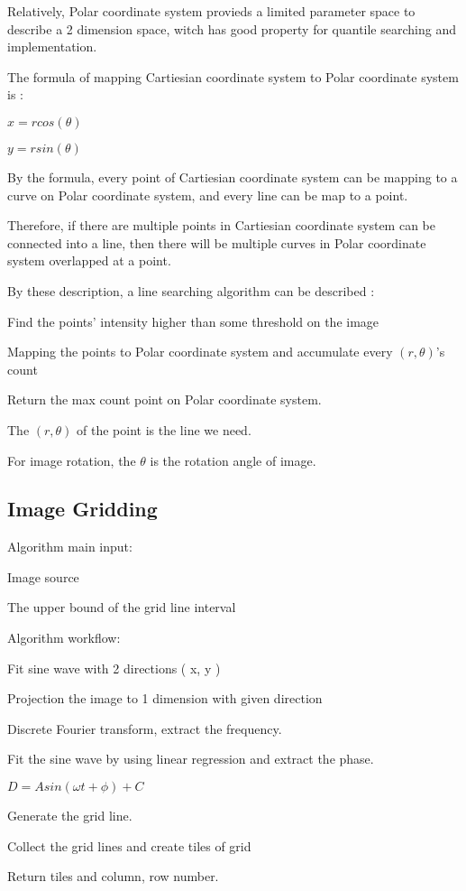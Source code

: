 Relatively, Polar coordinate system provieds a limited parameter space to describe a 2 dimension space, witch has good property for quantile searching and implementation.

The formula of mapping Cartiesian coordinate system to Polar coordinate system is \-:

$ x = rcos(\theta) $

$ y = rsin(\theta) $

By the formula, every point of Cartiesian coordinate system can be mapping to a curve on Polar coordinate system, and every line can be map to a point.

Therefore, if there are multiple points in Cartiesian coordinate system can be connected into a line, then there will be multiple curves in Polar coordinate system overlapped at a point.

By these description, a line searching algorithm can be described \-:


\begin{DoxyEnumerate}
\item Find the points' intensity higher than some threshold on the image
\item Mapping the points to Polar coordinate system and accumulate every $ (r, \theta ) $'s count
\item Return the max count point on Polar coordinate system.
\end{DoxyEnumerate}

The $ (r, \theta ) $ of the point is the line we need.

For image rotation, the $ \theta $ is the rotation angle of image. \hypertarget{improc_gridding}{}\subsection{Image Gridding}\label{improc_gridding}
Algorithm main input\-:


\begin{DoxyItemize}
\item Image source
\item The upper bound of the grid line interval
\end{DoxyItemize}

Algorithm workflow\-:


\begin{DoxyEnumerate}
\item Fit sine wave with 2 directions ( x, y )
\begin{DoxyEnumerate}
\item Projection the image to 1 dimension with given direction
\item Discrete Fourier transform, extract the frequency.
\item Fit the sine wave by using linear regression and extract the phase.\par
 $ D = A sin( \omega t + \phi ) + C $
\item Generate the grid line.
\end{DoxyEnumerate}
\item Collect the grid lines and create tiles of grid
\item Return tiles and column, row number.
\end{DoxyEnumerate}

